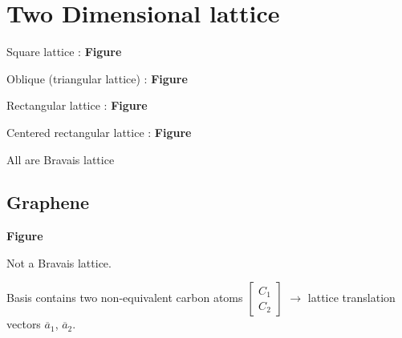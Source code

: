 \section*{Two Dimensional lattice}

Square lattice : {\bf Figure}

\noindent
Oblique (triangular lattice) : {\bf Figure}

\noindent
Rectangular lattice : {\bf Figure}

\noindent
Centered rectangular lattice : {\bf Figure}

\noindent
All are Bravais lattice

\subsection*{Graphene}

\begin{center}
{\bf Figure}
\end{center}
Not a Bravais lattice.

Basis contains two non-equivalent carbon atoms $\left[\begin{smallmatrix} C_{1}\\ C_{2}\end{smallmatrix}\right]$ $\to$ lattice translation vectors $\overline{a}_{1}$, $\overline{a}_{2}$.



